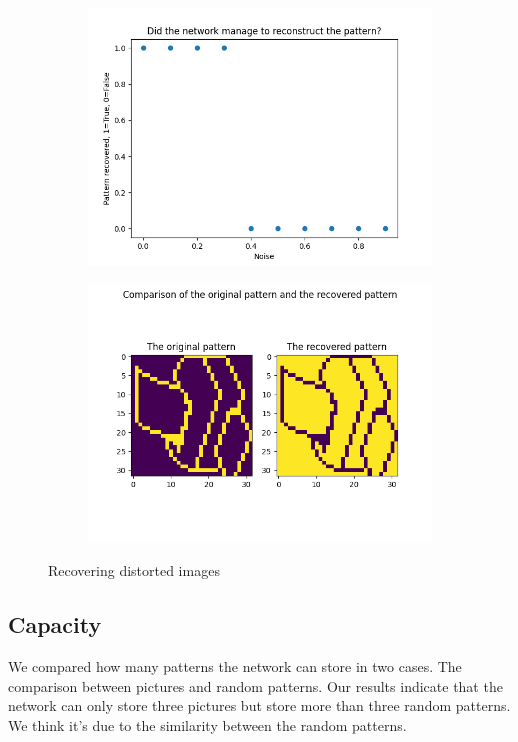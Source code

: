 \documentclass[a4paper]{article}
\begin{document}
\begin{figure}
    \centering
    \begin{subfigure}[b]{0.48\textwidth}
        \includegraphics[width=\textwidth]{Labs/Lab 3/images/distortion.png}
    \end{subfigure}
    \hfill
    \begin{subfigure}[b]{0.48\textwidth}
        \includegraphics[width=\textwidth]{Labs/Lab 3/images/inverted_pattern.png}
    \end{subfigure}
    \caption{Recovering distorted images}
    \label{fig:distortions}
\end{figure}

\subsection{Capacity}
We compared how many patterns the network can store in two cases. The comparison between pictures and random patterns.
Our results indicate that the network can only store three pictures but store more than three random patterns. We think it's due to the similarity between the random patterns. 
\end{document}
